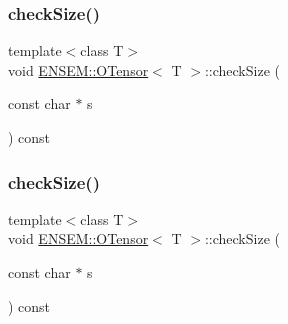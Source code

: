 \subsubsection{\texorpdfstring{checkSize()}{checkSize()}\hspace{0.1cm}{\footnotesize\ttfamily [1/6]}}
{\footnotesize\ttfamily template$<$class T$>$ \\
void \mbox{\hyperlink{classENSEM_1_1OTensor}{E\+N\+S\+E\+M\+::\+O\+Tensor}}$<$ T $>$\+::check\+Size (\begin{DoxyParamCaption}\item[{const char $\ast$}]{s }\end{DoxyParamCaption}) const\hspace{0.3cm}{\ttfamily [inline]}}

\mbox{\label{classENSEM_1_1OTensor_a09bfbf9385ec1bbe5050d4df43850f63}} 
\subsubsection{\texorpdfstring{checkSize()}{checkSize()}\hspace{0.1cm}{\footnotesize\ttfamily [2/6]}}
{\footnotesize\ttfamily template$<$class T$>$ \\
void \mbox{\hyperlink{classENSEM_1_1OTensor}{E\+N\+S\+E\+M\+::\+O\+Tensor}}$<$ T $>$\+::check\+Size (\begin{DoxyParamCaption}\item[{const char $\ast$}]{s }\end{DoxyParamCaption}) const\hspace{0.3cm}{\ttfamily [inline]}}

